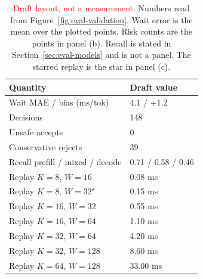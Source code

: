 \begin{table}[H]
  \centering
  \caption{\textcolor{red}{Draft layout, not a measurement.}
  Numbers read from Figure~\ref{fig:eval-validation}.
  Wait error is the mean over the plotted points.
  Risk counts are the points in panel (b).
  Recall is stated in Section~\ref{sec:eval-models} and is not a panel.
  The starred replay is the star in panel (c).}
  \label{tab:eval-rq4}
  \footnotesize
  \setlength{\tabcolsep}{3pt}
  \begin{tabular}{@{}ll@{}}
    \toprule
    Quantity & Draft value \\
    \midrule
    Wait MAE / bias (ms/tok) & 4.1 / +1.2 \\
    Decisions & 148 \\
    Unsafe accepts & 0 \\
    Conservative rejects & 39 \\
    Recall prefill / mixed / decode & 0.71 / 0.58 / 0.46 \\
    \midrule
    Replay $K{=}8$, $W{=}16$ & 0.08 ms \\
    Replay $K{=}8$, $W{=}32^{\star}$ & 0.15 ms \\
    Replay $K{=}16$, $W{=}32$ & 0.55 ms \\
    Replay $K{=}16$, $W{=}64$ & 1.10 ms \\
    Replay $K{=}32$, $W{=}64$ & 4.20 ms \\
    Replay $K{=}32$, $W{=}128$ & 8.60 ms \\
    Replay $K{=}64$, $W{=}128$ & 33.00 ms \\
    \bottomrule
  \end{tabular}
\end{table}
